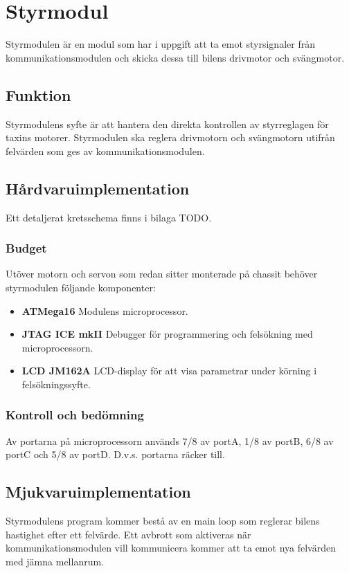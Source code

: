 \documentclass[designspec/spec.tex]{subfiles}
\begin{document}
\section{Styrmodul}
Styrmodulen är en modul som har i uppgift att ta emot styrsignaler från
kommunikationsmodulen och skicka dessa till bilens drivmotor och svängmotor.

\subsection{Funktion}
Styrmodulens syfte är att hantera den direkta kontrollen av styrreglagen för
taxins motorer. Styrmodulen ska reglera drivmotorn och svängmotorn utifrån
felvärden som ges av kommunikationsmodulen.

\subsection{Hårdvaruimplementation}
Ett detaljerat kretsschema finns i bilaga TODO.

\subsubsection{Budget}
Utöver motorn och servon som redan sitter monterade på chassit behöver
styrmodulen följande komponenter:

\begin{itemize}
	\item \textbf{ATMega16} Modulens microprocessor. 
    \item \textbf{JTAG ICE mkII} Debugger för programmering och felsökning med
    microprocessorn. 
    \item \textbf{LCD JM162A} LCD-display för att visa parametrar under körning
    i felsökningssyfte.
\end{itemize}

\subsubsection{Kontroll och bedömning}
Av portarna på microprocessorn används 7/8 av portA, 1/8 av portB, 6/8 av portC
och 5/8 av portD. D.v.s. portarna räcker till. %


\subsection{Mjukvaruimplementation}
Styrmodulens program kommer bestå av en main loop som reglerar bilens hastighet
efter ett felvärde. Ett avbrott som aktiveras när kommunikationsmodulen vill
kommunicera kommer att ta emot nya felvärden med jämna mellanrum.
\end{document}
